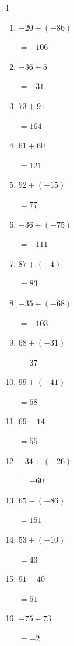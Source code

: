 \begin{multicols}{4}
\begin{enumerate}
        $=-27$

  \item $-20+(-86)$

        $=-106$

  \item $-36+5$

        $=-31$

  \item $73+91$

        $=164$

  \item $61+60$

        $=121$

  \item $92+(-15)$

        $=77$

  \item $-36+(-75)$

        $=-111$

  \item $87+(-4)$

        $=83$

  \item $-35+(-68)$

        $=-103$

  \item $68+(-31)$

        $=37$

  \item $99+(-41)$

        $=58$

\columnbreak %

\resetques

  \item $69-14$

        $=55$

  \item $-34+(-26)$

        $=-60$

  \item $65-(-86)$

        $=151$

  \item $53+(-10)$

        $=43$

  \item $91-40$

        $=51$

  \item $-75+73$

        $=-2$


\end{enumerate}
\end{multicols}
